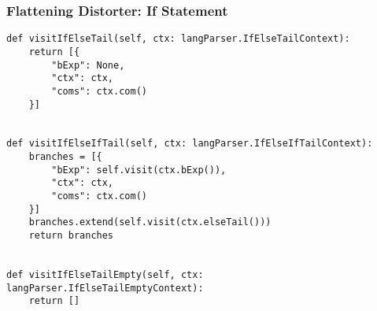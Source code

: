 \documentclass{beamer}
\begin{document}
\begin{frame}[fragile]
    \frametitle{Flattening Distorter: If Statement}
    \scriptsize
    \begin{verbatim}
def visitIfElseTail(self, ctx: langParser.IfElseTailContext):
    return [{
        "bExp": None,
        "ctx": ctx,
        "coms": ctx.com()
    }]


def visitIfElseIfTail(self, ctx: langParser.IfElseIfTailContext):
    branches = [{
        "bExp": self.visit(ctx.bExp()),
        "ctx": ctx,
        "coms": ctx.com()
    }]
    branches.extend(self.visit(ctx.elseTail()))
    return branches
    

def visitIfElseTailEmpty(self, ctx: langParser.IfElseTailEmptyContext):
    return []
    \end{verbatim}
\end{frame}
\end{document}
